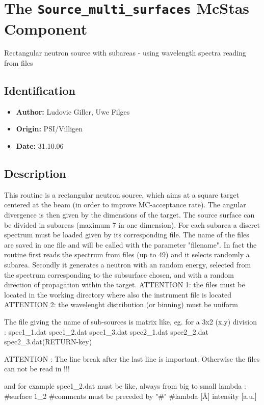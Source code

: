 \section{The \texttt{Source\_multi\_surfaces} McStas Component}
Rectangular neutron source with subareas - using wavelength spectra reading
from files

\subsection*{Identification}
\begin{itemize}
  \item \textbf{Author:} Ludovic Giller, Uwe Filges
  \item \textbf{Origin:} PSI/Villigen
  \item \textbf{Date:} 31.10.06
\end{itemize}

\subsection*{Description}
This routine is a rectangular neutron source, which aims at a square target centered at the beam (in order to improve MC-acceptance rate). The angular divergence is then given by the dimensions of the target. The source surface can be divided in subareas (maximum 7 in one dimension). For each subarea a discret spectrum must be loaded given by its corresponding file. The name of the files are saved in one file and will be called with the parameter "filename". In fact the routine first reads the spectrum from files (up to 49) and it selects randomly a subarea. Secondly it generates a neutron with an random energy, selected from the spectrum corresponding to the subsurface chosen, and with a random direction of propagation within the target. ATTENTION 1: the files must be located in the working directory where also the instrument file is located ATTENTION 2: the wavelenght distribution (or binning) must be uniform

The file giving the name of sub-sources is matrix like, eg. for a 3x2 (x,y) division : spec1\_1.dat spec1\_2.dat spec1\_3.dat spec2\_1.dat spec2\_2.dat spec2\_3.dat(RETURN-key)

ATTENTION : The line break after the last line is important. Otherwise the files can not be read in !!!

and for example spec1\_2.dat must be like, always from big to small lambda : \#surface 1\_2 \#comments must be preceded by "\#" \#lambda [\AA{}] intensity [a.u.]

